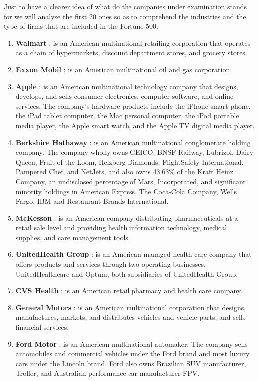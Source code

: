 \documentclass{book}
\begin{document}
Just to have a clearer idea of what do the companies under examination stands for we will analyse the first 20 ones so as to comprehend the industries and the type of firms that are included in the Fortune 500:
\begin{enumerate}
\item \textbf{Walmart }: is an American multinational retailing corporation that operates as a chain of hypermarkets, discount department stores, and grocery stores.
\item \textbf{Exxon Mobil } : is an American multinational oil and gas corporation.
\item \textbf{Apple } : is an American multinational technology company that designs, develops, and sells consumer electronics, computer software, and online services. The company's hardware products include the iPhone smart phone, the iPad tablet computer, the Mac personal computer, the iPod portable media player, the Apple smart watch, and the Apple TV digital media player. 
\item \textbf{Berkshire Hathaway } : is an American multinational conglomerate holding company. The company wholly owns GEICO, BNSF Railway, Lubrizol, Dairy Queen, Fruit of the Loom, Helzberg Diamonds, FlightSafety International, Pampered Chef, and NetJets, and also owns 43.63\% of the Kraft Heinz Company, an undisclosed percentage of Mars, Incorporated, and significant minority holdings in American Express, The Coca-Cola Company, Wells Fargo, IBM and Restaurant Brands International. 
\item \textbf{McKesson } : is an American company distributing pharmaceuticals at a retail sale level and providing health information technology, medical supplies, and care management tools.
\item \textbf{UnitedHealth Group } :  is an American managed health care company that offers products and services through two operating businesses, UnitedHealthcare and Optum, both subsidiaries of UnitedHealth Group. 
\item \textbf{CVS Health }:  is an American retail pharmacy and health care company. 
\item \textbf{General Motors }: is an American multinational corporation that designs, manufactures, markets, and distributes vehicles and vehicle parts, and sells financial services. 
\item \textbf{Ford Motor } :  is an American multinational automaker. The company sells automobiles and commercial vehicles under the Ford brand and most luxury cars under the Lincoln brand. Ford also owns Brazilian SUV manufacturer, Troller, and Australian performance car manufacturer FPV. 

\end{enumerate}
\end{document}
